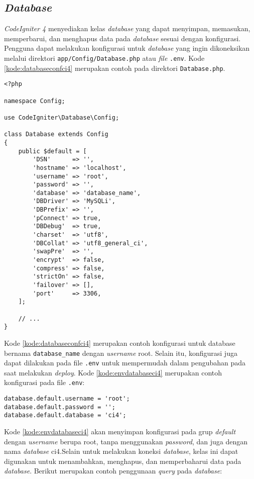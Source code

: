 \subsection{\textit{Database}}
\textit{CodeIgniter 4} menyediakan kelas \textit{database} yang dapat menyimpan, memasukan, memperbarui, dan menghapus data pada \textit{database} sesuai dengan konfigurasi. Pengguna dapat melakukan konfigurasi untuk \textit{database} yang ingin dikoneksikan melalui direktori \verb|app/Config/Database.php| atau \textit{file} \verb|.env|. Kode \ref{kode:databaseconfci4} merupakan contoh pada direktori \verb|Database.php|.

\begin{lstlisting}[caption=Contoh konfigurasi \textit{database} pada \textit{CodeIgniter 4}. ,label=kode:databaseconfci4]
<?php

namespace Config;

use CodeIgniter\Database\Config;

class Database extends Config
{
    public $default = [
        'DSN'      => '',
        'hostname' => 'localhost',
        'username' => 'root',
        'password' => '',
        'database' => 'database_name',
        'DBDriver' => 'MySQLi',
        'DBPrefix' => '',
        'pConnect' => true,
        'DBDebug'  => true,
        'charset'  => 'utf8',
        'DBCollat' => 'utf8_general_ci',
        'swapPre'  => '',
        'encrypt'  => false,
        'compress' => false,
        'strictOn' => false,
        'failover' => [],
        'port'     => 3306,
    ];

    // ...
}
\end{lstlisting}

Kode \ref{kode:databaseconfci4} merupakan contoh konfigurasi untuk database bernama \verb|database_name| dengan \textit{username} root. Selain itu, konfigurasi juga dapat dilakukan pada file \texttt{.env} untuk mempermudah dalam pengubahan pada saat melakukan \textit{deploy}. Kode \ref{kode:envdatabaseci4} merupakan contoh konfigurasi pada file \texttt{.env}:
\begin{lstlisting}[caption=Contoh konfigurasi \textit{database} pada file \texttt{.env}. ,label=kode:envdatabaseci4]
database.default.username = 'root';
database.default.password = '';
database.default.database = 'ci4';
\end{lstlisting}

Kode \ref{kode:envdatabaseci4} akan menyimpan konfigurasi pada grup \textit{default} dengan \textit{username} berupa root, tanpa menggunakan \textit{password}, dan juga dengan nama \textit{database} ci4.Selain untuk melakukan koneksi \textit{database}, kelas ini dapat digunakan untuk menambahkan, menghapus, dan memperbaharui data pada \textit{database}. Berikut merupakan contoh penggunaan \textit{query} pada \textit{database}:

